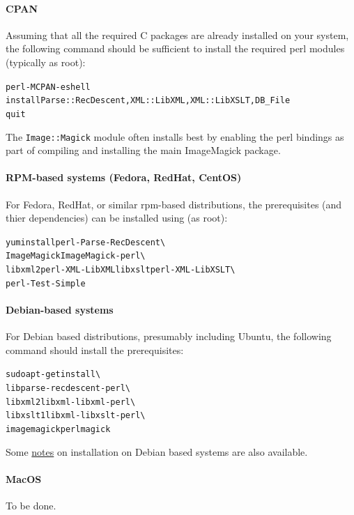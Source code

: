 \documentclass{article}
\begin{document}
\paragraph{CPAN}
Assuming that all the required C packages are already installed on your system,
  the following command should be sufficient to install the required perl 
  modules (typically as root):
\begin{alltt}
   perl -MCPAN -e shell
   install Parse::RecDescent, XML::LibXML, XML::LibXSLT, DB_File
   quit
\end{alltt}
The \texttt{Image::Magick} module often installs best by enabling the
perl bindings as part of compiling and installing the main ImageMagick package.

\paragraph[RPM-based systems]{RPM-based systems (Fedora, RedHat, CentOS)}
For Fedora, RedHat, or similar rpm-based distributions,
the prerequisites (and thier dependencies) can be installed using
(as root):
\begin{alltt}
   yum install perl-Parse-RecDescent  \textbackslash\\
     ImageMagick ImageMagick-perl  \textbackslash\\
     libxml2 perl-XML-LibXML libxslt perl-XML-LibXSLT \textbackslash\\
     perl-Test-Simple
\end{alltt}

\paragraph{Debian-based systems}
For Debian based distributions, presumably including Ubuntu, the following
command  should install the prerequisites:
\begin{alltt}
   sudo apt-get install   \textbackslash\\
      libparse-recdescent-perl \textbackslash\\
      libxml2 libxml-libxml-perl \textbackslash\\
      libxslt1 libxml-libxslt-perl  \textbackslash\\
      imagemagick perlmagick
\end{alltt}
Some \href{http://rhaptos.org/devblog/reedstrm/latexml}{notes} on installation on Debian
based systems are also available.

\paragraph{MacOS}
To be done.
\end{document}

